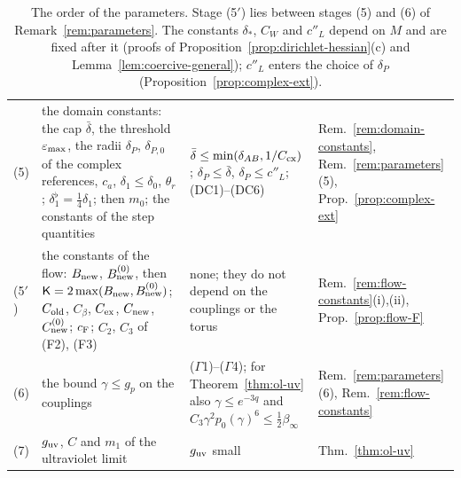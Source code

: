 \begin{table}[tbp]
\begin{tabular}{|p{}|p{}|p{}|p{}|}
(5) & \raggedright the domain constants: the cap $\bar\delta$, the threshold $\varepsilon_{\max}$, the radii $\delta_P$, $\delta_{P,0}$ of the complex references, $c_a$, $\delta_1\le\delta_0$, $\theta_r$; $\delta_1^\flat=\frac14\delta_1$; then $m_0$; the constants of the step quantities & \raggedright $\bar\delta\le\min(\delta_{AB},1/C_{\rm cx})$; $\delta_P\le\bar\delta$, $\delta_P\le c''_L$; (DC1)--(DC6) & \raggedright Rem.~\ref{rem:domain-constants}, Rem.~\ref{rem:parameters}(5), Prop.~\ref{prop:complex-ext}\tabularnewline
(5$'$) & \raggedright the constants of the flow: $B_{\rm new}$, $B_{\rm new}^{(0)}$, then $\mathsf K=2\max(B_{\rm new},B^{(0)}_{\rm new})$; $C_{\rm old}$, $C_\beta$, $C_{\rm ex}$, $C_{\rm new}$, $C^{(0)}_{\rm new}$; $c_{\rm F}$; $C_2$, $C_3$ of (F2), (F3) & \raggedright none; they do not depend on the couplings or the torus & \raggedright Rem.~\ref{rem:flow-constants}(i),(ii), Prop.~\ref{prop:flow-F}\tabularnewline
(6) & \raggedright the bound $\gamma\le g_p$ on the couplings & \raggedright ($\Gamma$1)--($\Gamma$4); for Theorem~\ref{thm:ol-uv} also $\gamma\le e^{-3q}$ and $C_3\gamma^2p_0(\gamma)^6\le\frac12\beta_\infty$ & \raggedright Rem.~\ref{rem:parameters}(6), Rem.~\ref{rem:flow-constants}\tabularnewline
(7) & \raggedright $g_{\rm uv}$, $C$ and $m_1$ of the ultraviolet limit & \raggedright $g_{\rm uv}$ small & \raggedright Thm.~\ref{thm:ol-uv}\tabularnewline
\hline
\end{tabular}
\caption{The order of the parameters. Stage (5$'$) lies between stages (5) and (6) of Remark~\ref{rem:parameters}. The constants $\delta_*$, $C_W$ and $c''_L$ depend on $M$ and are fixed after it (proofs of Proposition~\ref{prop:dirichlet-hessian}(c) and Lemma~\ref{lem:coercive-general}); $c''_L$ enters the choice of $\delta_P$ (Proposition~\ref{prop:complex-ext}).}\label{tab:G-parameters}
\end{table}

